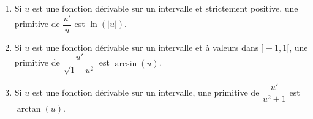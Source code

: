 \documentclass[french,11pt,twoside]{VcCours}
\newcommand{\dx}{\text{d}x}
\newcommand{\Int}[2]{\int_{#1}^{#2}}
\begin{document}
\medskip

\begin{Exemples}
\begin{enumerate}
\item Si $u$ est une fonction dérivable sur un intervalle et strictement positive, une primitive de $\dfrac{u'}{u}$ est $\ln( \vert u \vert)$.
\item Si $u$ est une fonction dérivable sur un intervalle et à valeurs dans $]-1,1[$, une primitive de $\dfrac{u'}{\sqrt{1-u^2}}$ est $\arcsin(u)$.
\item Si $u$ est une fonction dérivable sur un intervalle, une primitive de $\dfrac{u'}{u^2+1}$ est $\arctan(u)$.
\end{enumerate}
\end{Exemples}

%
%
%
%
%
\end{document}
